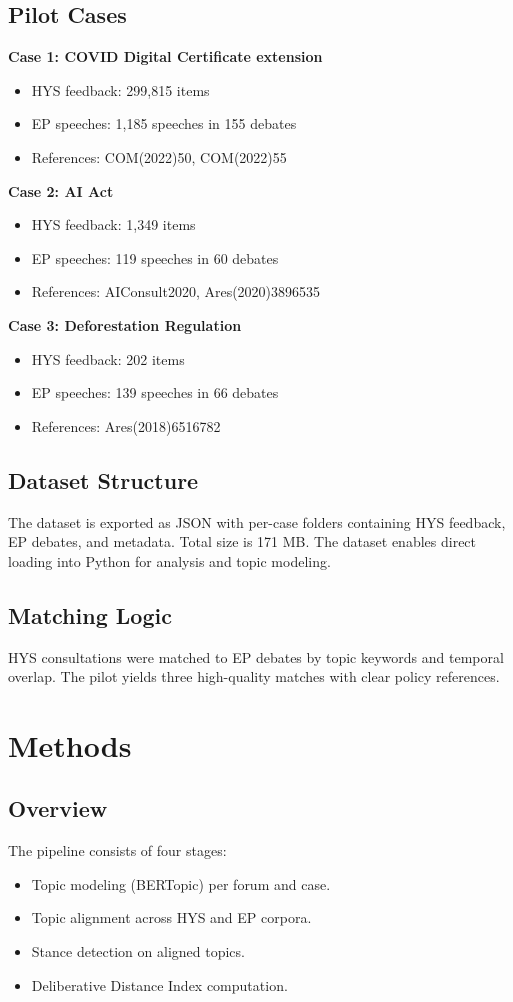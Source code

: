 \documentclass[11pt,a4paper]{article}
\begin{document}
\subsection{Pilot Cases}
\textbf{Case 1: COVID Digital Certificate extension}
\begin{itemize}
  \item HYS feedback: 299,815 items
  \item EP speeches: 1,185 speeches in 155 debates
  \item References: COM(2022)50, COM(2022)55
\end{itemize}

\textbf{Case 2: AI Act}
\begin{itemize}
  \item HYS feedback: 1,349 items
  \item EP speeches: 119 speeches in 60 debates
  \item References: AIConsult2020, Ares(2020)3896535
\end{itemize}

\textbf{Case 3: Deforestation Regulation}
\begin{itemize}
  \item HYS feedback: 202 items
  \item EP speeches: 139 speeches in 66 debates
  \item References: Ares(2018)6516782
\end{itemize}

\subsection{Dataset Structure}
The dataset is exported as JSON with per-case folders containing HYS feedback, EP debates, and metadata. Total size is 171 MB. The dataset enables direct loading into Python for analysis and topic modeling.

\subsection{Matching Logic}
HYS consultations were matched to EP debates by topic keywords and temporal overlap. The pilot yields three high-quality matches with clear policy references.

\section{Methods}
\subsection{Overview}
The pipeline consists of four stages:
\begin{itemize}
  \item Topic modeling (BERTopic) per forum and case.
  \item Topic alignment across HYS and EP corpora.
  \item Stance detection on aligned topics.
  \item Deliberative Distance Index computation.
\end{itemize}
\end{document}
